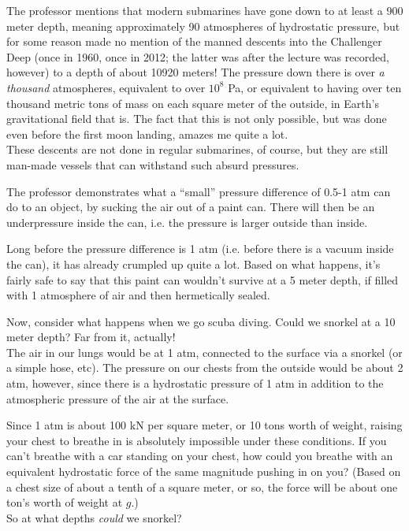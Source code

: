 The professor mentions that modern submarines have gone down to at least a 900 meter depth, meaning approximately 90 atmospheres of hydrostatic pressure, but for some reason made no mention of the manned descents into the Challenger Deep (once in 1960, once in 2012; the latter was after the lecture was recorded, however) to a depth of about 10920 meters! The pressure down there is over \emph{a thousand} atmospheres, equivalent to over $10^8$ Pa, or equivalent to having over ten thousand metric tons of mass on each square meter of the outside, in Earth's gravitational field that is. The fact that this is not only possible, but was done even before the first moon landing, amazes me quite a lot.\\
These descents are not done in regular submarines, of course, but they are still man-made vessels that can withstand such absurd pressures.

The professor demonstrates what a ``small'' pressure difference of 0.5-1 atm can do to an object, by sucking the air out of a paint can. There will then be an underpressure inside the can, i.e. the pressure is larger outside than inside.

Long before the pressure difference is 1 atm (i.e. before there is a vacuum inside the can), it has already crumpled up quite a lot. Based on what happens, it's fairly safe to say that this paint can wouldn't survive at a 5 meter depth, if filled with 1 atmosphere of air and then hermetically sealed. 

Now, consider what happens when we go scuba diving. Could we snorkel at a 10 meter depth? Far from it, actually!\\
The air in our lungs would be at 1 atm, connected to the surface via a snorkel (or a simple hose, etc). The pressure on our chests from the outside would be about 2 atm, however, since there is a hydrostatic pressure of 1 atm in addition to the atmospheric pressure of the air at the surface.

Since 1 atm is about 100 kN per square meter, or 10 tons worth of weight, raising your chest to breathe in is absolutely impossible under these conditions. If you can't breathe with a car standing on your chest, how could you breathe with an equivalent hydrostatic force of the same magnitude pushing in on you? (Based on a chest size of about a tenth of a square meter, or so, the force will be about one ton's worth of weight at $g$.)\\
So at what depths \emph{could} we snorkel?

